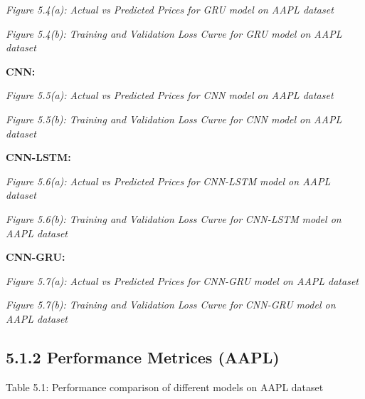 \documentclass[12pt,a4paper]{report}
\begin{document}
\begin{center}
\textit{Figure 5.4(a): Actual vs Predicted Prices for GRU model on AAPL dataset}
\end{center}
\begin{center}
\textit{Figure 5.4(b): Training and Validation Loss Curve for GRU model on AAPL dataset}
\end{center}
\textbf{CNN:}

\begin{center}
\textit{Figure 5.5(a): Actual vs Predicted Prices for CNN model on AAPL dataset}
\end{center}
\begin{center}
\textit{Figure 5.5(b): Training and Validation Loss Curve for CNN model on AAPL dataset}
\end{center}
\textbf{CNN-LSTM:}

\begin{center}
\textit{Figure 5.}\textit{6}\textit{(a): Actual vs Predicted Prices for }\textit{CNN-LSTM}\textit{ model on AAPL dataset}
\end{center}
\begin{center}
\textit{Figure 5.}\textit{6}\textit{(b): Training and Validation Loss Curve for }\textit{CNN-LSTM}\textit{ model on AAPL dataset}
\end{center}
\textbf{CNN-GRU:}

\begin{center}
\textit{Figure 5.}\textit{7}\textit{(a): Actual vs Predicted Prices for }\textit{CNN-GRU}\textit{ model on AAPL dataset}
\end{center}
\begin{center}
\textit{Figure 5.}\textit{7}\textit{(b): Training and Validation Loss Curve for }\textit{CNN-GRU }\textit{model on AAPL dataset}
\end{center}
\subsection{5.1.2 Performance Metrices (AAPL)}
Table 5.1: Performance comparison of different models on AAPL dataset
\end{document}
